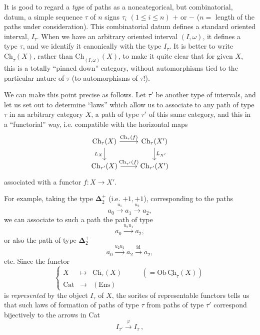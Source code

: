 \documentclass[11pt]{article}
\newcommand{\printedpage}[1]{\marginpar{\footnotesize p.~#1}}
\newcommand{\msp}[1]{\marginpar{\footnotesize [#1]}}
\newcommand{\Ch}{\underline{\mathrm{Ch}}}
\newcommand{\bDelta}{\boldsymbol{\Delta}}
\begin{document}
\printedpage{13}

\msp{page 20}

It is good to regard a \textit{type} of paths as a noncategorical, but combinatorial, datum, a simple sequence $\tau$ of $n$ signs $\tau_i$ $(1 \leq i \leq n)$ $+$ or $-$ ($n =$ length of the paths under consideration). This combinatorial datum defines a standard oriented interval, $I_\tau$. When we have an arbitrary oriented interval $(I,\omega)$, it defines a type $\tau$, and we identify it canonically with the type $I_\tau$. It is better to write $\Ch_\tau(X)$, rather than $\Ch_{(I,\omega)}(X)$, to make it quite clear that for given $X$, this is a totally ``pinned down'' category, without automorphisms tied to the particular nature of $\tau$ (to automorphisms of $\tau$!). %

We can make this point precise as follows. Let $\tau'$ be another type of intervals, and let us set out to determine ``laws'' which allow us to associate to any path of type $\tau$ in an arbitrary category $X$, a path of type $\tau'$ of this same category, and this in a ``functorial'' way, i.e. compatible with the horizontal maps
\[
\begin{tikzcd}
\mathrm{Ch}_\tau(X) \arrow[r, "\mathrm{Ch}_\tau(f)"] \arrow[d, "L_X"'] & \mathrm{Ch}_\tau(X') \arrow[d, "L_{X'}"] \\
\mathrm{Ch}_{\tau'}(X) \arrow[r, "\mathrm{Ch}_{\tau'}(f)"] & \mathrm{Ch}_{\tau'}(X')
\end{tikzcd}
\]
associated with a functor $f : X \longrightarrow X'$.

\msp{page 21}

For example, taking the type $\bDelta_2^+$ (i.e. $+1,+1$), corresponding to the paths
\[
a_0 \xrightarrow{u_1} a_1 \xrightarrow{u_2} a_2,
\]
we can associate to such a path the path of type
\[
a_0 \xrightarrow{u_2u_1} a_2,
\]
or also the path of type $\bDelta_2^+$
\[
a_0 \xrightarrow{u_2u_1} a_2 \xrightarrow{\mathrm{id}} a_2,
\]
etc. Since the functor
\[
\left\{
\begin{array}{cccl}
X & \longmapsto & \mathrm{Ch}_\tau(X) & \qquad (= \mathrm{Ob}\, \Ch_\tau(X)) \\[1ex]
\mathrm{Cat} & \longrightarrow & (\mathrm{Ens}) &
\end{array}
\right.
\]
is \textit{represented} by the object $I_\tau$ of $X$, the sorites of representable functors tells us that such laws of formation of paths of type $\tau$ from paths of type $\tau'$ correspond bijectively to the arrows in Cat
\[
I_{\tau'} \xrightarrow{\varphi} I_\tau\ ,
\]
\end{document}
